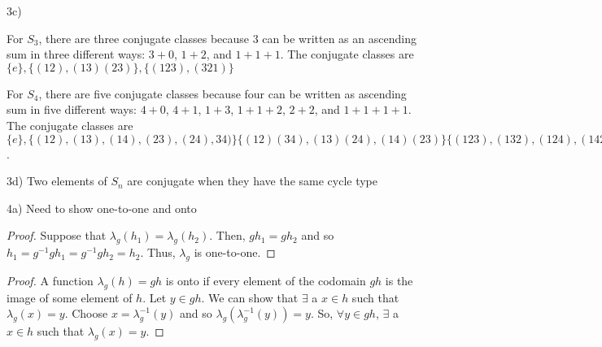\documentclass[executivepaper]{article}
\begin{document}
\begin{flushleft}

3c)

\begin{center}

For $S_{3}$, there are three conjugate classes because $3$ can be written as an ascending sum in three different ways: $3+0$, $1+2$, and $1+1+1$. The conjugate classes are $\{e\}, \{(12),(13)(23)\}, \{(123),(321)\}$

\vspace{3mm}

For $S_{4}$, there are five conjugate classes because four can be written as ascending sum in five different ways: $4+0$, $4+1$, $1+3$, $1+1+2$, $2+2$, and $1+1+1+1$. The conjugate classes are $\{e\}, \{(12),(13),(14),(23),(24), 34)\} \{(12)(34), (13)(24), (14)(23) \} \{(123), (132), (124), (142), (134), (143), (234), (243)\} \{(1234), (1342), (1243), (1423), (1324), (1432)\}$.

\end{center}

\end{flushleft}

\begin{flushleft}

3d) Two elements of $S_{n}$ are conjugate when they have the same cycle type

\end{flushleft}

\begin{flushleft}

4a) Need to show one-to-one and onto

\begin{center}

\begin{proof}

Suppose that $\lambda_{g}(h_{1})=\lambda_{g}(h_{2})$. Then, $gh_{1}=gh_{2}$ and so $h_{1}=g^{-1}gh_{1}=g^{-1}gh_{2}=h_{2}$. Thus, $\lambda_{g}$ is one-to-one.

\end{proof}

\end{center}

\begin{center}

\begin{proof}

A function $\lambda_{g}(h)=gh$ is onto if every element of the codomain $gh$ is the image of some element of $h$. Let $y \in gh$. We can show that $\exists$ a $x \in h$ such that $\lambda_{g}(x)=y$. Choose $x=\lambda_{g}^{-1}(y)$ and so $\lambda_{g}(\lambda_{g}^{-1}(y))=y$. So, $\forall y \in gh$, $\exists$ a $x \in h$ such that $\lambda_{g}(x)=y$. 

\end{proof}

\end{center}

\end{flushleft}
\end{document}
